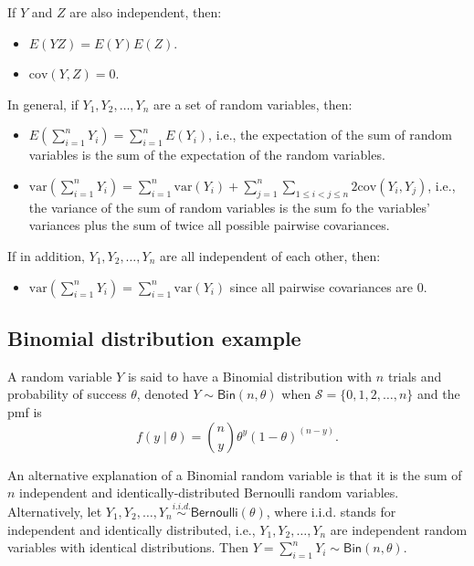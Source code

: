 \documentclass[
]{book}
\providecommand{\tightlist}{%
  \setlength{\itemsep}{0pt}\setlength{\parskip}{0pt}}
\theoremstyle{definition}
\theoremstyle{definition}
\theoremstyle{definition}
\theoremstyle{definition}
\theoremstyle{remark}
\begin{document}
If \(Y\) and \(Z\) are also independent, then:

\begin{itemize}
\tightlist
\item
  \(E(YZ)=E(Y)E(Z)\).
\item
  \(\mathrm{cov}(Y, Z)=0\).
\end{itemize}

In general, if \(Y_1, Y_2, \ldots, Y_n\) are a set of random variables, then:

\begin{itemize}
\tightlist
\item
  \(E(\sum_{i=1}^n Y_i) = \sum_{i=1}^n E(Y_i)\), i.e., the expectation of the sum of random variables is the sum of the expectation of the random variables.
\item
  \(\mathrm{var}(\sum_{i=1}^n Y_i) = \sum_{i=1}^n \mathrm{var}(Y_i) + \sum_{j=1}^n\sum_{1\leq i<j\leq n}2\mathrm{cov}(Y_i, Y_j)\), i.e., the variance of the sum of random variables is the sum fo the variables' variances plus the sum of twice all possible pairwise covariances.
\end{itemize}

If in addition, \(Y_1, Y_2, \ldots, Y_n\) are all independent of each other, then:

\begin{itemize}
\tightlist
\item
  \(\mathrm{var}(\sum_{i=1}^n Y_i) = \sum_{i=1}^n \mathrm{var}(Y_i)\) since all pairwise covariances are 0.
\end{itemize}

\hypertarget{binomial-distribution-example}{%
\subsection{Binomial distribution example}\label{binomial-distribution-example}}

A random variable \(Y\) is said to have a Binomial distribution with \(n\) trials and probability of success \(\theta\), denoted \(Y\sim \mathsf{Bin}(n,\theta)\) when \(\mathcal{S}=\{0,1,2,\ldots,n\}\) and the pmf is
\[f(y\mid\theta) = \binom{n}{y} \theta^y (1-\theta)^{(n-y)}.\]

An alternative explanation of a Binomial random variable is that it is the sum of \(n\) independent and identically-distributed Bernoulli random variables. Alternatively, let \(Y_1,Y_2,\ldots,Y_n\stackrel{i.i.d.}{\sim} \mathsf{Bernoulli}(\theta)\), where i.i.d. stands for independent and identically distributed, i.e., \(Y_1, Y_2, \ldots, Y_n\) are independent random variables with identical distributions. Then \(Y=\sum_{i=1}^n Y_i \sim \mathsf{Bin}(n,\theta)\).
\end{document}
